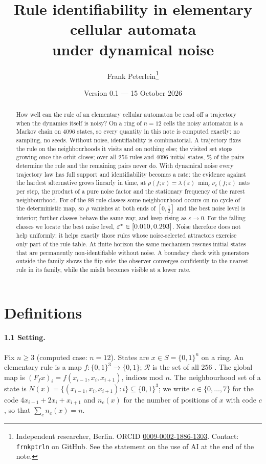 \documentclass[11pt,a4paper]{article}
\title{Rule identifiability in elementary cellular automata\\under dynamical noise}
\author{Frank Peterlein\thanks{Independent researcher, Berlin. ORCID \href{https://orcid.org/0009-0002-1886-1303}{0009-0002-1886-1303}. Contact: \texttt{frnkptrln} on GitHub. See the statement on the use of AI at the end of the note.}}
\date{Version 0.1 --- 15 October 2026}
\theoremstyle{remark}
\newcommand{\eps}{\varepsilon}
\newcommand{\R}{\mathcal{R}}
\begin{document}
\maketitle

\begin{abstract}
\noindent
How well can the rule of an elementary cellular automaton be read off a trajectory when the dynamics itself is noisy? On a ring of $n=12$ cells the noisy automaton is a Markov chain on $4096$ states, so every quantity in this note is computed exactly: no sampling, no seeds. Without noise, identifiability is combinatorial. A trajectory fixes the rule on the neighbourhoods it visits and on nothing else; the visited set stops growing once the orbit closes; over all $256$ rules and $4096$ initial states, \ZeroFracFullAll\% of the pairs determine the rule and the remaining pairs never do. With dynamical noise every trajectory law has full support and identifiability becomes a rate: the evidence against the hardest alternative grows linearly in time, at $\rho(f;\eps)=\lambda(\eps)\,\min_c\nu_c(f;\eps)$ nats per step, the product of a pure noise factor and the stationary frequency of the rarest neighbourhood. For \NumClassesBproved{} of the $88$ rule classes some neighbourhood occurs on no cycle of the deterministic map, so $\rho$ vanishes at both ends of $[0,\tfrac12]$ and the best noise level is interior; \NumFallingU{} further classes behave the same way, and \NumRisingU{} keep rising as $\eps\to0$. For the \NumInterior{} falling classes we locate the best noise level, $\eps^*\in[\EpsStarMin,\EpsStarMax]$. Noise therefore does not help uniformly: it helps exactly those rules whose noise-selected attractors exercise only part of the rule table. At finite horizon the same mechanism rescues initial states that are permanently non-identifiable without noise. A boundary check with generators outside the family shows the flip side: the observer converges confidently to the nearest rule in its family, while the misfit becomes visible at a lower rate.
\end{abstract}

\section{Definitions}

\paragraph{1.1 Setting.}
Fix $n\ge3$ (computed case: $n=12$). States are $x\in S=\{0,1\}^n$ on a ring. An elementary rule is a map $f:\{0,1\}^3\to\{0,1\}$; $\R$ is the set of all $256$ \citep{Wolfram1983}. The global map is $(F_f x)_i=f(x_{i-1},x_i,x_{i+1})$, indices mod $n$. The neighbourhood set of a state is $N(x)=\{(x_{i-1},x_i,x_{i+1}):i\}\subseteq\{0,1\}^3$; we write $c\in\{0,\dots,7\}$ for the code $4x_{i-1}+2x_i+x_{i+1}$ and $n_c(x)$ for the number of positions of $x$ with code $c$, so that $\sum_c n_c(x)=n$.
\end{document}
